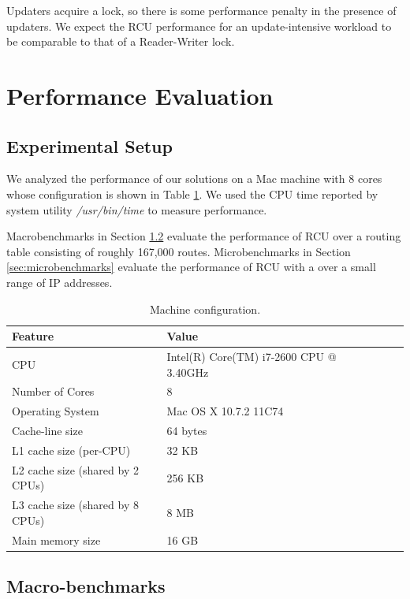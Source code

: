\documentclass[a4paper,marginparwidth=50pt,marginparsep=10pt]{article}
\begin{document}
Updaters acquire a lock, so there is some performance penalty in the presence of updaters. We expect the RCU performance for an update-intensive workload to be comparable to that of a Reader-Writer lock.

\section{Performance Evaluation}
\label{sec:perfeval}
\subsection{Experimental Setup}
We analyzed the performance of our solutions on a Mac machine with 8 cores whose configuration is shown in Table \ref{tbl:machinemac}.
We used the CPU time reported by system utility \emph{/usr/bin/time} to measure performance.

Macrobenchmarks in Section \ref{sec:macrobenchmarks} evaluate the performance of RCU over a routing table consisting of roughly 167,000 routes. Microbenchmarks in Section \ref{sec:microbenchmarks} evaluate the performance of RCU with a over a small range of IP addresses.

\begin{table}
\begin{center}
\begin{tabular}{|l|l|l|l|l|l|}
\hline Feature & Value\\
\hline CPU &Intel(R) Core(TM) i7-2600 CPU @ 3.40GHz\\
\hline Number of Cores & 8\\
\hline Operating System & Mac OS X 10.7.2 11C74\\
\hline Cache-line size & 64 bytes\\
\hline L1 cache size (per-CPU) & 32 KB\\
\hline L2 cache size (shared by 2 CPUs) & 256 KB\\
\hline L3 cache size (shared by 8 CPUs)& 8 MB\\
\hline Main memory size & 16 GB\\
\hline
\end{tabular}
\end{center}
\caption{Machine configuration.}
\label{tbl:machinemac}
\end{table}

\subsection{Macro-benchmarks}
\label{sec:macrobenchmarks}
\end{document}
